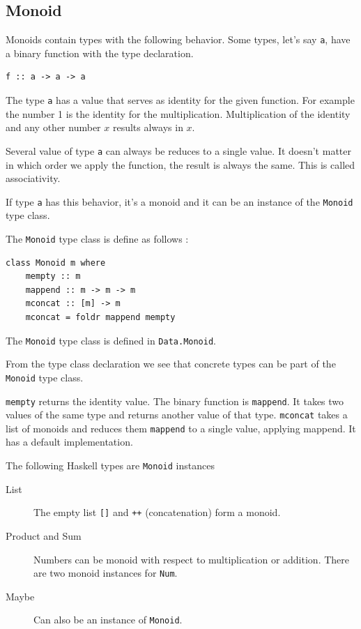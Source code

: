 \subsection{Monoid}
\label{sec:monoid}

Monoids contain types with the following behavior. 
Some types, let's say \verb|a|, have a binary function with the type declaration. 
\begin{verbatim}
f :: a -> a -> a
\end{verbatim}

The type \verb|a| has a value that serves as identity for the given function. For example the number 1 is the identity for the multiplication. Multiplication of the identity and any other number $x$ results always in $x$.

Several value of type \verb|a| can always be reduces to a single value. It doesn't matter in which order we apply the function, the result is always the same. This is called associativity.

If type \verb|a| has this behavior, it's a monoid and it can be an instance of the \verb|Monoid| type class.

The \verb|Monoid| type class is define as follows \cite{monoid}:
\begin{verbatim}
class Monoid m where
    mempty :: m
    mappend :: m -> m -> m
    mconcat :: [m] -> m
    mconcat = foldr mappend mempty
\end{verbatim}

The \verb|Monoid| type class is defined in \verb|Data.Monoid|. 

From the type class declaration we see that concrete types can be part of the \verb|Monoid| type class. 

\verb|mempty| returns the identity value. The binary function is \verb|mappend|. It takes two values of the same type and returns another value of that type. \verb|mconcat| takes a list of monoids and reduces them \verb|mappend| to a single value, applying mappend. It has a default implementation.

The following Haskell types are \verb|Monoid| instances
\begin{description}
\item[List] The empty list \verb|[]| and \verb|++| (concatenation) form a monoid.
\item[Product and Sum] Numbers can be monoid with respect to multiplication or addition. There are two monoid instances for \verb|Num|.
\item[Maybe] Can also be an instance of \verb|Monoid|. 
\end{description}

